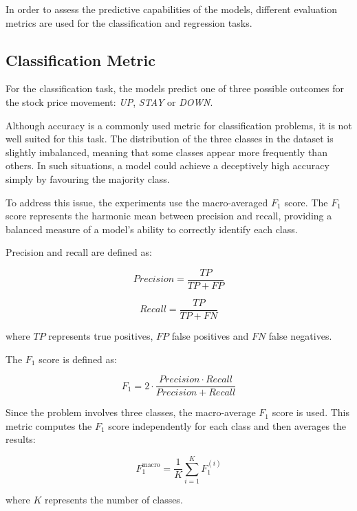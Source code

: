 In order to assess the predictive capabilities of the models, different evaluation metrics are used for the classification and regression tasks.

\subsection{Classification Metric}

For the classification task, the models predict one of three possible outcomes for the stock price movement:
\textit{UP}, \textit{STAY} or \textit{DOWN}.

Although accuracy is a commonly used metric for classification problems, it is not well suited for this task. The distribution of the three classes in the dataset is slightly imbalanced, meaning that some classes appear more frequently than others. In such situations, a model could achieve a deceptively high accuracy simply by favouring the majority class.

To address this issue, the experiments use the macro-averaged $F_1$ score. The $F_1$ score represents the harmonic mean between precision and recall, providing a balanced measure of a model's ability to correctly identify each class.

Precision and recall are defined as:

\begin{equation}
Precision = \frac{TP}{TP + FP}
\end{equation}

\begin{equation}
Recall = \frac{TP}{TP + FN}
\end{equation}

where $TP$ represents true positives, $FP$ false positives and $FN$ false negatives.

The $F_1$ score is defined as:

\begin{equation}
F_1 = 2 \cdot \frac{Precision \cdot Recall}{Precision + Recall}
\end{equation}

Since the problem involves three classes, the macro-average $F_1$ score is used. This metric computes the $F_1$ score independently for each class and then averages the results:

\begin{equation}
F_{1}^{\text{macro}} = \frac{1}{K} \sum_{i=1}^{K} F_{1}^{(i)}
\end{equation}

where $K$ represents the number of classes.

